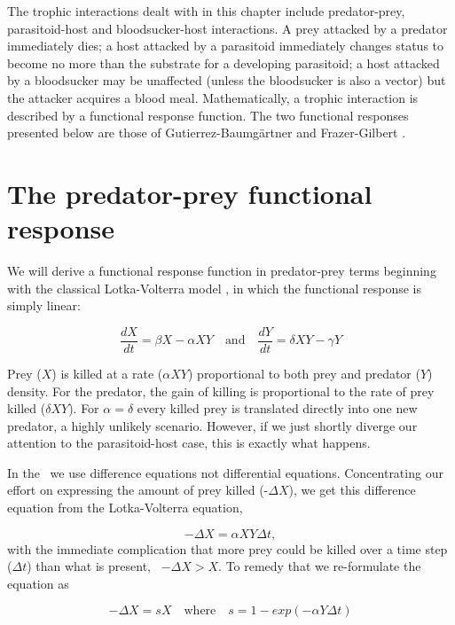 The trophic interactions dealt with in this chapter include predator-prey, parasitoid-host and bloodsucker-host interactions. A prey attacked by a predator immediately dies; a host attacked by a parasitoid immediately changes status to become no more than the substrate for a developing parasitoid; a host attacked by a bloodsucker may be unaffected (unless the bloodsucker is also a vector) but the attacker acquires a blood meal. Mathematically, a trophic interaction is described by a functional response function. The two functional responses presented below are those of Gutierrez-Baumg{\"a}rtner \citep{Guti96} and Frazer-Gilbert \citep{FrazerGilbert}.

\section{The predator-prey functional response}
\label{ch:trophic-functional-response}

We will derive a functional response function in predator-prey terms beginning with the classical Lotka-Volterra model \citep{LotkaVolterra}, in which the functional response is simply linear:

\begin{equation}
\frac{dX}{dt} = \beta X - \alpha XY \quad\text{and}\quad \frac{dY}{dt} = \delta XY - \gamma Y 
\label{eq:lotvol0}
\end{equation}

Prey ($X$) is killed at a rate ($\alpha XY$) proportional to both prey and predator ($Y$) density. For the predator, the gain of killing is proportional to the rate of prey killed ($\delta XY$). For $\alpha = \delta$ every killed prey is translated directly into one new predator, a highly unlikely scenario. However, if we just shortly diverge our attention to the parasitoid-host case, this is exactly what happens.

In the \US\ we use difference equations not differential equations. Concentrating our effort on expressing the amount of prey killed (-$\Delta X$), we get this difference equation from the Lotka-Volterra equation,

\begin{equation}
-\Delta X = \alpha XY \Delta t \label{eq:lotvol1},
\end{equation}
with the immediate complication that more prey could be killed over a time step ($\Delta t$) than what is present, \ie\ $-\Delta X > X$. To remedy that  we re-formulate the equation as 

\begin{equation}
-\Delta X = sX \quad\text{where}\quad s = 1-exp(-\alpha Y \Delta t) \label{eq:lotvol2}
\end{equation}
 
